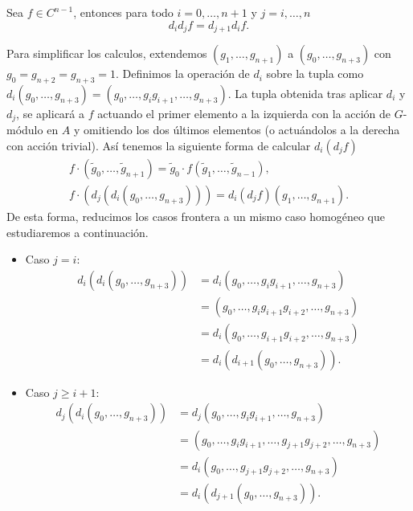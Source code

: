 
\begin{lema}\label{lem:coborde}
	Sea $f\in C^{n-1}$, entonces para todo $i=0,\ldots,n+1$ y $j=i,\ldots,n$
	\begin{equation}
		d_id_jf=d_{j+1}d_if.
	\end{equation}
	\begin{demostracion}
		Para simplificar los calculos, extendemos $(g_1,\ldots,g_{n+1})$ a $(g_0,\ldots,g_{n+3})$ con $g_0=g_{n+2}=g_{n+3}=1$.
		Definimos la operación de $d_i$ sobre la tupla como $d_i(g_0,\ldots,g_{n+3}) = (g_0,\ldots,g_ig_{i+1},\ldots,g_{n+3})$. La tupla obtenida tras aplicar $d_i$ y $d_j$, se aplicará a $f$ actuando el primer elemento a la izquierda con la acción de $G$-módulo en $A$ y omitiendo los dos últimos elementos (o actuándolos a la derecha con acción trivial). Así tenemos la siguiente forma de calcular $d_i(d_jf)$
		\begin{align}
			f\cdot (\tilde g_0,\ldots,\tilde g_{n+1}) = \tilde g_0 \cdot f(\tilde g_1,\ldots,\tilde g_{n-1}),  \\
			f\cdot (d_j(d_i(g_0,\ldots,g_{n+3}))) = d_i(d_jf)(g_1,\ldots,g_{n+1}).	\label{eq:homcohom}
		\end{align}
		De esta forma, reducimos los casos frontera a un mismo caso homogéneo que estudiaremos a continuación.
		
		\begin{itemize}
			\item Caso $j=i$:
				\begin{align*}
					d_i(d_i(g_0,\ldots,g_{n+3})) 
					&= d_i(g_0,\ldots,g_ig_{i+1},\ldots,g_{n+3}) \\
					&= (g_0,\ldots,g_ig_{i+1}g_{i+2},\ldots,g_{n+3}) \\
					&= d_i(g_0,\ldots,g_{i+1}g_{i+2},\ldots,g_{n+3}) \\
					&= d_i(d_{i+1}(g_0,\ldots,g_{n+3})).
				\end{align*}
			\item Caso $j\geq i+1$:
				\begin{align*}
					d_j(d_i(g_0,\ldots,g_{n+3})) 
					&= d_j(g_0,\ldots,g_ig_{i+1},\ldots,g_{n+3}) \\
					&= (g_0,\ldots,g_ig_{i+1},\ldots,g_{j+1}g_{j+2},\ldots,g_{n+3}) \\
					&= d_i(g_0,\ldots,g_{j+1}g_{j+2},\ldots,g_{n+3}) \\
					&= d_i(d_{j+1}(g_0,\ldots,g_{n+3})).
				\end{align*}
		\end{itemize}
		

\end{demostracion}
\end{lema}
